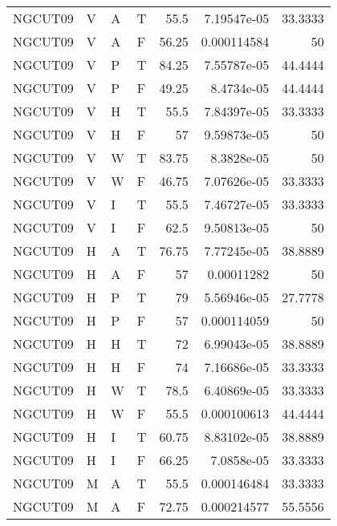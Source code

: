 \begin{longtable}{llllrrr}
    NGCUT09  & V     & A     & T          & 55.5       & 7.19547e-05 & 33.3333  \\
    NGCUT09  & V     & A     & F          & 56.25      & 0.000114584 & 50       \\
    NGCUT09  & V     & P     & T          & 84.25      & 7.55787e-05 & 44.4444  \\
    NGCUT09  & V     & P     & F          & 49.25      & 8.4734e-05  & 44.4444  \\
    NGCUT09  & V     & H     & T          & 55.5       & 7.84397e-05 & 33.3333  \\
    NGCUT09  & V     & H     & F          & 57         & 9.59873e-05 & 50       \\
    NGCUT09  & V     & W     & T          & 83.75      & 8.3828e-05  & 50       \\
    NGCUT09  & V     & W     & F          & 46.75      & 7.07626e-05 & 33.3333  \\
    NGCUT09  & V     & I     & T          & 55.5       & 7.46727e-05 & 33.3333  \\
    NGCUT09  & V     & I     & F          & 62.5       & 9.50813e-05 & 50       \\
    NGCUT09  & H     & A     & T          & 76.75      & 7.77245e-05 & 38.8889  \\
    NGCUT09  & H     & A     & F          & 57         & 0.00011282  & 50       \\
    NGCUT09  & H     & P     & T          & 79         & 5.56946e-05 & 27.7778  \\
    NGCUT09  & H     & P     & F          & 57         & 0.000114059 & 50       \\
    NGCUT09  & H     & H     & T          & 72         & 6.99043e-05 & 38.8889  \\
    NGCUT09  & H     & H     & F          & 74         & 7.16686e-05 & 33.3333  \\
    NGCUT09  & H     & W     & T          & 78.5       & 6.40869e-05 & 33.3333  \\
    NGCUT09  & H     & W     & F          & 55.5       & 0.000100613 & 44.4444  \\
    NGCUT09  & H     & I     & T          & 60.75      & 8.83102e-05 & 38.8889  \\
    NGCUT09  & H     & I     & F          & 66.25      & 7.0858e-05  & 33.3333  \\
    NGCUT09  & M     & A     & T          & 55.5       & 0.000146484 & 33.3333  \\
    NGCUT09  & M     & A     & F          & 72.75      & 0.000214577 & 55.5556  \\

\end{longtable}
